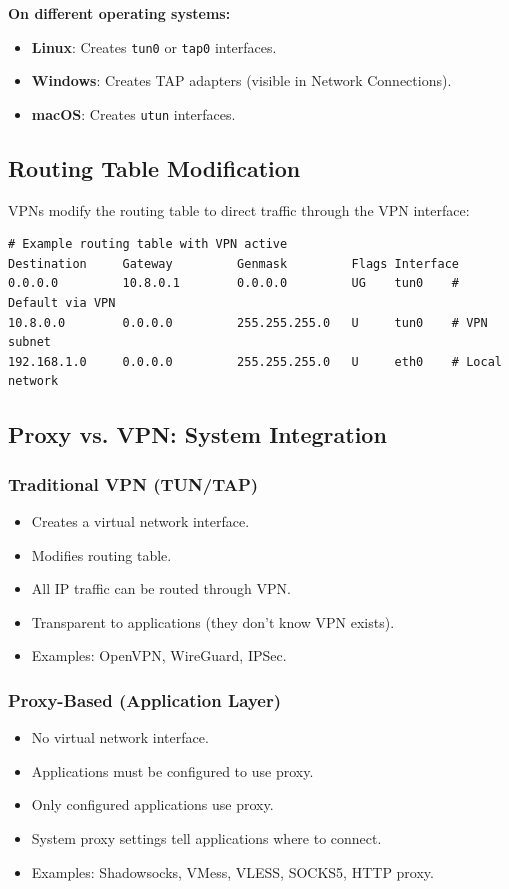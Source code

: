 \textbf{On different operating systems:}
\begin{itemize}
    \item \textbf{Linux}: Creates \texttt{tun0} or \texttt{tap0} interfaces.
    \item \textbf{Windows}: Creates TAP adapters (visible in Network Connections).
    \item \textbf{macOS}: Creates \texttt{utun} interfaces.
\end{itemize}

\subsection{Routing Table Modification}

VPNs modify the routing table to direct traffic through the VPN interface:

\begin{verbatim}
# Example routing table with VPN active
Destination     Gateway         Genmask         Flags Interface
0.0.0.0         10.8.0.1        0.0.0.0         UG    tun0    # Default via VPN
10.8.0.0        0.0.0.0         255.255.255.0   U     tun0    # VPN subnet
192.168.1.0     0.0.0.0         255.255.255.0   U     eth0    # Local network
\end{verbatim}

\subsection{Proxy vs. VPN: System Integration}

\subsubsection{Traditional VPN (TUN/TAP)}
\begin{itemize}
    \item Creates a virtual network interface.
    \item Modifies routing table.
    \item All IP traffic can be routed through VPN.
    \item Transparent to applications (they don't know VPN exists).
    \item Examples: OpenVPN, WireGuard, IPSec.
\end{itemize}

\subsubsection{Proxy-Based (Application Layer)}
\begin{itemize}
    \item No virtual network interface.
    \item Applications must be configured to use proxy.
    \item Only configured applications use proxy.
    \item System proxy settings tell applications where to connect.
    \item Examples: Shadowsocks, VMess, VLESS, SOCKS5, HTTP proxy.
\end{itemize}

